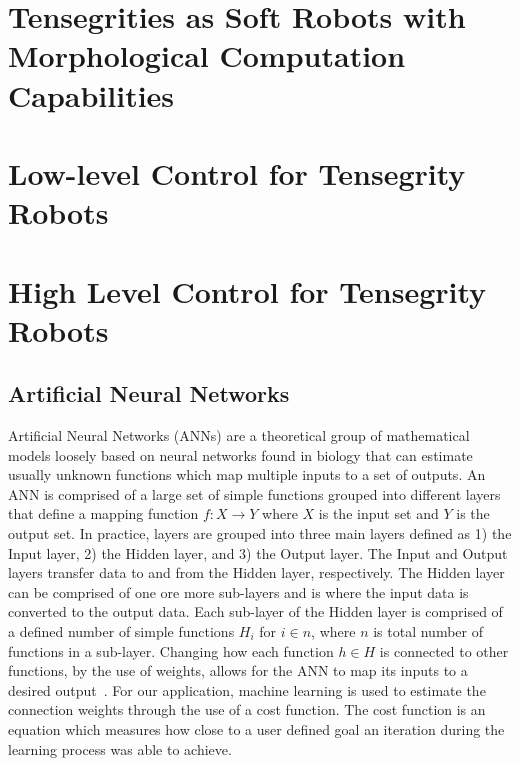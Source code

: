 \section{Tensegrities as Soft Robots with Morphological Computation Capabilities}
\label{sec:robots}


\section{Low-level Control for Tensegrity Robots}
\label{sec:control}


\section{High Level Control for Tensegrity Robots}
\label{sec:NN_and_Planning_overview}

\subsection{Artificial Neural Networks}
Artificial Neural Networks (ANNs) are a theoretical group of mathematical models loosely based on neural networks found in biology that can estimate usually unknown functions which map multiple inputs to a set of outputs.
An ANN is comprised of a large set of simple functions grouped into different layers that define a mapping function \(f:X \to Y\) where \(X\) is the input set and \(Y\) is the output set.
In practice, layers are grouped into three main layers defined as 1) the Input layer, 2) the Hidden layer, and 3) the Output layer.
The Input and Output layers transfer data to and from the Hidden layer, respectively.
The Hidden layer can be comprised of one ore more sub-layers and is where the input data is converted to the output data.
Each sub-layer of the Hidden layer is comprised of a defined number of simple functions \(H_{i}\) for \(i \in n\), where \(n\) is total number of functions in a sub-layer.
Changing how each function \(h \in H\) is connected to other functions, by the use of weights, allows for the ANN to map its inputs to a desired output~\cite{lippmann1987introduction}. For our application, machine learning is used to estimate the connection weights through the use of a cost function.
The cost function is an equation which measures how close to a user defined goal an iteration during the learning process was able to achieve.


